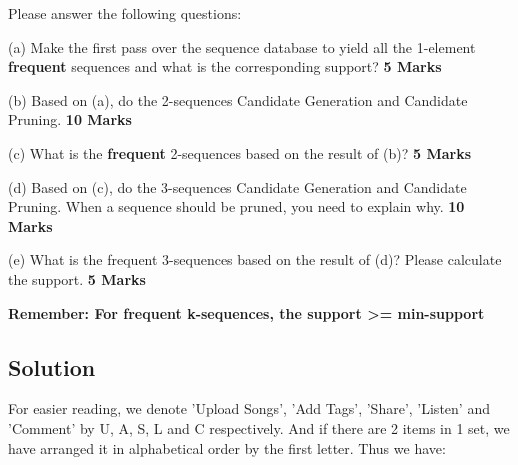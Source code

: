 \documentclass[en,black,normal,10pt]{elegantnote}
\begin{document}
Please answer the following questions:

(a) Make the first pass over the sequence database to yield all the 1-element \textbf{frequent} sequences and what is the corresponding support? \textbf{5 Marks}

(b) Based on (a), do the 2-sequences Candidate Generation and Candidate Pruning. \textbf{10 Marks}

(c) What is the \textbf{frequent} 2-sequences based on the result of (b)? \textbf{5 Marks}

(d) Based on (c), do the 3-sequences Candidate Generation and Candidate Pruning.
When a sequence should be pruned, you need to explain why. \textbf{10 Marks}

(e) What is the frequent 3-sequences based on the result of (d)?
Please calculate the support. \textbf{5 Marks}

\textbf{Remember: For frequent k-sequences, the support >= min-support}

\subsection*{Solution}

For easier reading, we denote 'Upload Songs', 'Add Tags', 'Share', 'Listen' and 'Comment' by U, A, S, L and C respectively.
And if there are 2 items in 1 set, we have arranged it in alphabetical order by the first letter.
Thus we have:
\end{document}
